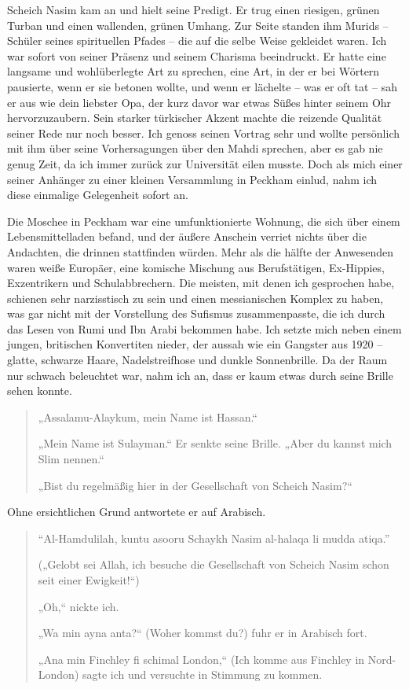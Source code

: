\documentclass[12pt]{memoir}
\def\–{-\hskip0pt}
\begin{document}
Scheich Nasim kam an und hielt seine Predigt.
Er trug einen riesigen, grünen Turban und einen wallenden, grünen Umhang.
Zur Seite standen ihm Murids – Schüler seines spirituellen Pfades –
die auf die selbe Weise gekleidet waren.
Ich war sofort von seiner Präsenz und seinem Charisma beeindruckt.
Er hatte eine langsame und wohlüberlegte Art zu sprechen, eine Art,
in der er bei Wörtern pausierte, wenn er sie betonen wollte,
und wenn er lächelte – was er oft tat – sah er aus wie dein liebster Opa,
der kurz davor war etwas Süßes hinter seinem Ohr hervorzuzaubern.
Sein starker türkischer Akzent machte die reizende Qualität
seiner Rede nur noch besser.
Ich genoss seinen Vortrag sehr und wollte persönlich mit ihm
über seine Vorhersagungen über den Mahdi sprechen,
aber es gab nie genug Zeit, da ich immer zurück zur Universität eilen musste.
Doch als mich einer seiner Anhänger
zu einer kleinen Versammlung in Peckham einlud,
nahm ich diese einmalige Gelegenheit sofort an.

Die Moschee in Peckham war eine umfunktionierte Wohnung,
die sich über einem Lebensmittelladen befand,
und der äußere Anschein verriet nichts über die Andachten,
die drinnen stattfinden würden.
Mehr als die hälfte der Anwesenden waren weiße Europäer,
eine komische Mischung aus Berufstätigen,
Ex\–Hippies, Exzentrikern und Schulabbrechern.
Die meisten, mit denen ich gesprochen habe,
schienen sehr narzisstisch zu sein und einen messianischen Komplex zu haben,
was gar nicht mit der Vorstellung des Sufismus zusammenpasste,
die ich durch das Lesen von Rumi und Ibn Arabi bekommen habe.
Ich setzte mich neben einem jungen, britischen Konvertiten nieder,
der aussah wie ein Gangster aus 1920 –
glatte, schwarze Haare, Nadelstreifhose und dunkle Sonnenbrille.
Da der Raum nur schwach beleuchtet war, nahm ich an,
dass er kaum etwas durch seine Brille sehen konnte.

\begin{quote}
„Assalamu-Alaykum, mein Name ist Hassan.“

„Mein Name ist Sulayman.“
Er senkte seine Brille.
„Aber du kannst mich Slim nennen.“

„Bist du regelmäßig hier in der Gesellschaft von Scheich Nasim?“
\end{quote}

Ohne ersichtlichen Grund antwortete er auf Arabisch.

\begin{quote}
“Al-Hamdulilah, kuntu asooru Schaykh Nasim al-halaqa li mudda atiqa.”

(„Gelobt sei Allah, ich besuche die Gesellschaft von Scheich Nasim
schon seit einer Ewigkeit!“)

„Oh,“ nickte ich.

„Wa min ayna anta?“ (Woher kommst du?) fuhr er in Arabisch fort.

„Ana min Finchley fi schimal London,“
(Ich komme aus Finchley in Nord-London)
sagte ich und versuchte in Stimmung zu kommen.
\end{quote}
\end{document}
